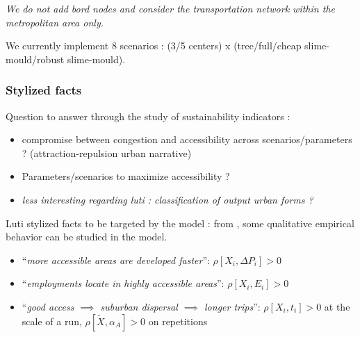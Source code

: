 \textit{We do not add bord nodes and consider the transportation network within the metropolitan area only.}

We currently implement 8 scenarios : (3/5 centers) x (tree/full/cheap slime-mould/robust slime-mould).


\subsubsection{Stylized facts}

Question to answer through the study of sustainability indicators :
\begin{itemize}
  \item compromise between congestion and accessibility across scenarios/parameters ? (attraction-repulsion urban narrative)
  \item Parameters/scenarios to maximize accessibility ?
  \item \textit{less interesting regarding luti : classification of output urban forms ?}
\end{itemize}


Luti stylized facts to be targeted by the model : from \cite{wegener2004land}, some qualitative empirical behavior can be studied in the model.


\begin{itemize}
	\item ``\textit{more accessible areas are developed faster}'': $\rho\left[X_i,\Delta P_i\right] > 0$
	\item ``\textit{employments locate in highly accessible areas}'': $\rho\left[X_i,E_i\right] > 0$
	\item ``\textit{good access $\implies$ suburban dispersal $\implies$ longer trips}'': $\rho\left[X_i,t_i\right] > 0$ at the scale of a run, $\rho\left[\tilde{X},\alpha_A\right] > 0$ on repetitions
\end{itemize}

